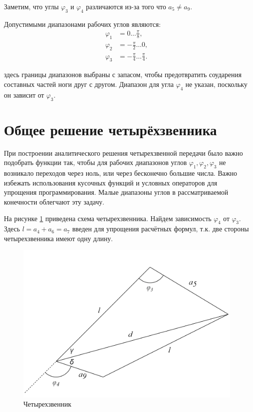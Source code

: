 Заметим, что углы $ \varphi_3 $ и $ \varphi_4 $ различаются из-за того что $ a_5 \neq a_9 $. 

Допустимыми диапазонами рабочих углов являются:
\begin{align*}
    \varphi_1&=0 \dots \frac \pi 8, \\
    \varphi_2&=-\frac \pi 2 \dots 0 ,\\
    \varphi_3&=-\frac \pi 4 \dots \frac \pi 4.
\end{align*}

\noindent здесь границы диапазонов выбраны с запасом, чтобы предотвратить соударения составных частей ноги друг с другом. Диапазон для угла $ \varphi_4 $ не указан, поскольку он зависит от $ \varphi_3 $. 

\section{Общее решение четырёхзвенника} \label{sec:pre_direct_kin}

При построении аналитического решения четырехзвенной передачи было важно подобрать функции так, чтобы для рабочих диапазонов углов $ \varphi_1, \varphi_2, \varphi_3 $ не возникало переходов через ноль, или через бесконечно большие числа. Важно избежать использования кусочных функций и условных операторов для упрощения программирования.
Малые диапазоны углов в рассматриваемой конечности облегчают эту задачу.

На рисунке \ref{fig:scheme_four} приведена схема четырехзвенника. Найдем зависимость $ \varphi_4 $ от $ \varphi_3 $. Здесь $ l= a_4 + a_6=a_7 $ введен для упрощения расчётных формул, т.к. две стороны четырехзвенника имеют одну длину.
\begin{figure}[h]
    \centering
    \includegraphics[scale=1]{chapter_kinematics/figure4.png}
    \caption{Четырехзвенник}
    \label{fig:scheme_four}
\end{figure}

